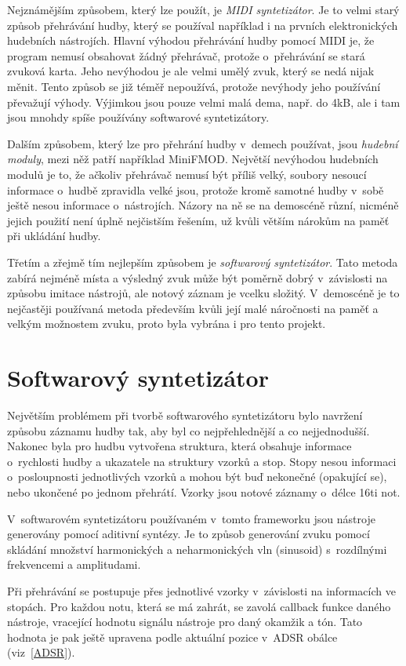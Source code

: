 Nejznámějším způsobem, který lze použít, je \emph{MIDI syntetizátor}.
Je to velmi starý způsob přehrávání hudby, který se používal například i na prvních elektronických hudebních nástrojích.
Hlavní výhodou přehrávání hudby pomocí MIDI je, že program nemusí obsahovat žádný přehrávač, protože o~přehrávání se stará zvuková karta.
Jeho nevýhodou je ale velmi umělý zvuk, který se nedá nijak měnit.
Tento způsob se již téměř nepoužívá, protože nevýhody jeho používání převažují výhody. 
Výjimkou jsou pouze velmi malá dema, např. do 4kB, ale i tam jsou mnohdy spíše používány softwarové syntetizátory.

Dalším způsobem, který lze pro přehrání hudby v~demech používat, jsou \emph{hudební moduly}, mezi něž patří například MiniFMOD.
Největší nevýhodou hudebních modulů je to, že ačkoliv přehrávač nemusí být příliš velký, soubory nesoucí informace o~hudbě zpravidla velké jsou, protože kromě samotné hudby v~sobě ještě nesou informace o~nástrojích.
Názory na ně se na demoscéně různí, nicméně jejich použití není úplně nejčistším řešením, už kvůli větším nárokům na paměť při ukládání hudby. 

Třetím a zřejmě tím nejlepším způsobem je \emph{softwarový syntetizátor}.
Tato metoda zabírá nejméně místa a výsledný zvuk může být poměrně dobrý v~závislosti na způsobu imitace nástrojů, ale notový záznam je vcelku složitý.
V~demoscéně je to nejčastěji používaná metoda především kvůli její malé náročnosti na paměť a velkým možnostem zvuku, proto byla vybrána i pro tento projekt.

\section{Softwarový syntetizátor}
Největším problémem při tvorbě softwarového syntetizátoru bylo navržení způsobu záznamu hudby tak, aby byl co nejpřehlednější a co nejjednodušší.
Nakonec byla pro hudbu vytvořena struktura, která obsahuje informace o~rychlosti hudby a ukazatele na struktury vzorků a stop.
Stopy nesou informaci o~posloupnosti jednotlivých vzorků a mohou být buď nekonečné (opakující se), nebo ukončené po jednom přehrátí.
Vzorky jsou notové záznamy o~délce 16ti not. 

V~softwarovém syntetizátoru používaném v~tomto frameworku jsou nástroje generovány pomocí aditivní syntézy.
Je to způsob generování zvuku pomocí skládání množství harmonických a neharmonických vln (sinusoid) s~rozdílnými frekvencemi a amplitudami.

Při přehrávání se postupuje přes jednotlivé vzorky v~závislosti na informacích ve stopách.
Pro každou notu, která se má zahrát, se zavolá callback funkce daného nástroje, vracející hodnotu signálu nástroje pro daný okamžik a tón.
Tato hodnota  je pak ještě upravena podle aktuální pozice v~ADSR obálce (viz~\ref{ADSR}).

